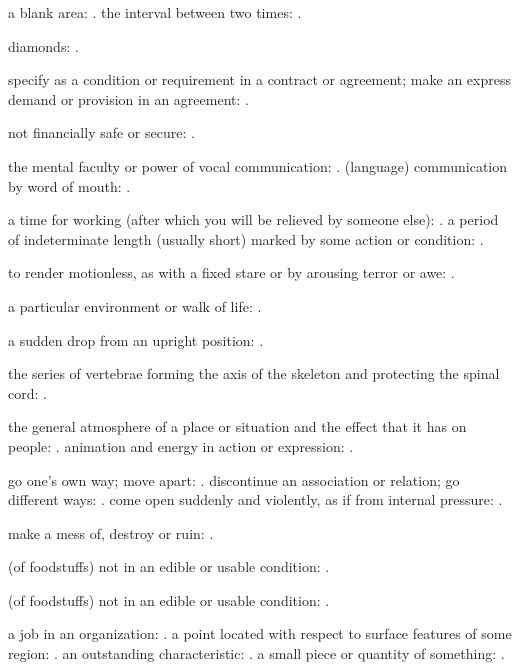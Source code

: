  a blank area: . the interval between two times: .

  diamonds: .

  specify as a condition or requirement in a contract or agreement; make an express demand or provision in an agreement: .

  not financially safe or secure: .

  the mental faculty or power of vocal communication: . (language) communication by word of mouth: .

  a time for working (after which you will be relieved by someone else): . a period of indeterminate length (usually short) marked by some action or condition: .

  to render motionless, as with a fixed stare or by arousing terror or awe: .

  a particular environment or walk of life: .

  a sudden drop from an upright position: .

  the series of vertebrae forming the axis of the skeleton and protecting the spinal cord: .

  the general atmosphere of a place or situation and the effect that it has on people: . animation and energy in action or expression: .

  go one's own way; move apart: . discontinue an association or relation; go different ways: . come open suddenly and violently, as if from internal pressure: .

  make a mess of, destroy or ruin: .

  (of foodstuffs) not in an edible or usable condition: .

  (of foodstuffs) not in an edible or usable condition: .

  a job in an organization: . a point located with respect to surface features of some region: . an outstanding characteristic: . a small piece or quantity of something: .

